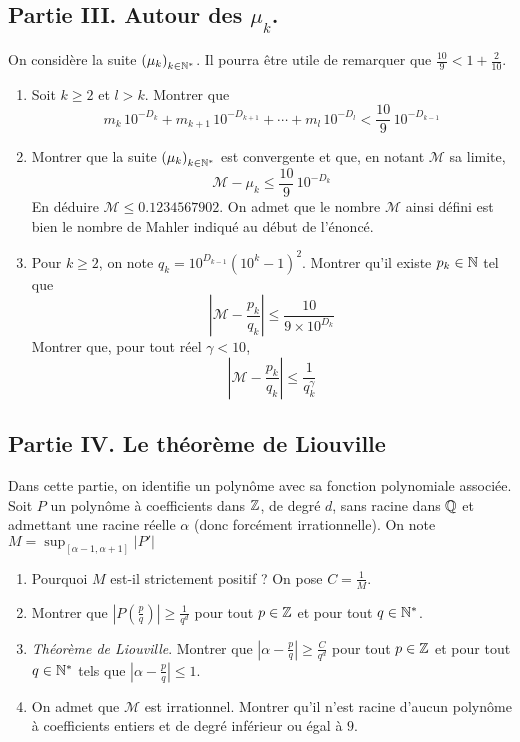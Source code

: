 \subsection*{Partie III. Autour des $\mu_k$.}
On considère la suite $\left( \mu_k\right) _{k\in \mathbb{N}^*}$. Il pourra être utile de remarquer que $\frac{10}{9}< 1 +\frac{2}{10}$.
\begin{enumerate}
 \item Soit $k\geq 2$ et $l>k$. Montrer que
\begin{displaymath}
 m_k\,10^{-D_k} + m_{k+1}\,10^{-D_{k+1}} + \cdots + m_l\,10^{-D_l} < \frac{10}{9}\,10^{-D_{k-1}}  
\end{displaymath}
\item Montrer que la suite $\left( \mu_k\right) _{k\in \mathbb{N}^*}$ est convergente et que, en notant $\mathcal M$ sa limite,
\begin{displaymath}
  \mathcal M - \mu_k \leq \frac{10}{9}\,10^{-D_{k}}
\end{displaymath}
En déduire $\mathcal M \leq  0.1234567902$.\newline
On admet que le nombre $\mathcal M$ ainsi défini est bien le nombre de Mahler indiqué au début de l'énoncé. 
\item Pour $k\geq 2$, on note $q_k=10^{D_{k-1}}(10^k-1)^2$. Montrer qu'il existe $p_k\in \mathbb{N}$ tel que
\begin{displaymath}
 \left\vert \mathcal{M} - \frac{p_k}{q_k}\right| \leq \frac{10}{9\times10^{D_k}}
\end{displaymath}
Montrer que, pour tout réel $\gamma < 10$,
\begin{displaymath}
 \left\vert \mathcal{M} - \frac{p_k}{q_k}\right| \leq \frac{1}{q_k^\gamma}
\end{displaymath}
\end{enumerate}

\subsection*{Partie IV. Le théorème de Liouville}
Dans cette partie, on identifie un polynôme avec sa fonction polynomiale associée.\newline
Soit $P$ un polynôme à coefficients dans $\mathbb{Z}$, de degré $d$, sans racine dans $\mathbb{Q}$ et admettant une racine réelle $\alpha$ (donc forcément irrationnelle).\newline
 On note 
$M = \sup_{[\alpha - 1, \alpha +1]} |P'| $
\begin{enumerate}
\item Pourquoi $M$ est-il strictement positif ? On pose $C = \frac{1}{M}$.
\item Montrer que $\left|P(\frac{p}{q})\right| \geq \frac{1}{q^d}$ pour tout $p\in \mathbb{Z}$ et pour tout $q\in\mathbb{N}^*$.

\item \emph{Théorème de Liouville}. Montrer que $|\alpha - \frac{p}{q}|\geq \frac{C}{q^d}$ pour tout $p\in \mathbb{Z}$ et pour tout $q\in\mathbb{N}^*$ tels que $|\alpha - \frac{p}{q}|\leq 1$.

\item On admet que $\mathcal{M}$ est irrationnel. Montrer qu'il n'est racine d'aucun polynôme à coefficients entiers et de degré inférieur ou égal à $9$.
\end{enumerate}